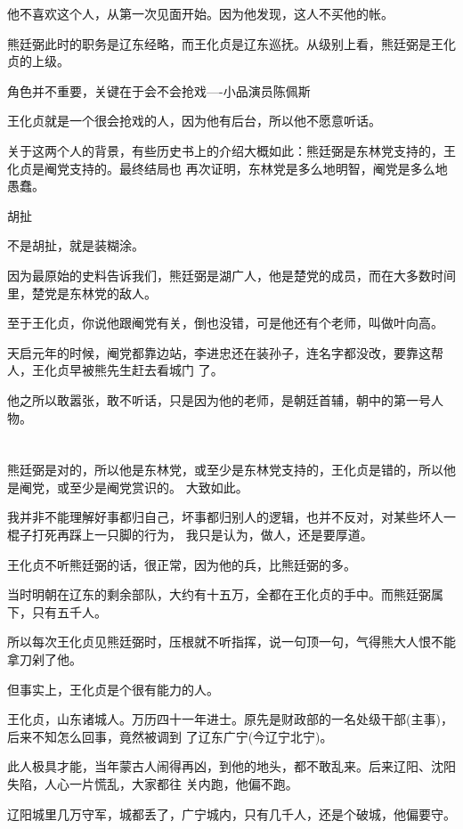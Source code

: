 \documentclass[11pt,a4paper,onecolumn]{article}
\begin{document}
他不喜欢这个人，从第一次见面开始。因为他发现，这人不买他的帐。

熊廷弼此时的职务是辽东经略，而王化贞是辽东巡抚。从级别上看，熊廷弼是王化贞的上级。

角色并不重要，关键在于会不会抢戏----小品演员陈佩斯

王化贞就是一个很会抢戏的人，因为他有后台，所以他不愿意听话。

关于这两个人的背景，有些历史书上的介绍大概如此：熊廷弼是东林党支持的，王化贞是阉党支持的。最终结局也
再次证明，东林党是多么地明智，阉党是多么地愚蠢。

胡扯

不是胡扯，就是装糊涂。

因为最原始的史料告诉我们，熊廷弼是湖广人，他是楚党的成员，而在大多数时间里，楚党是东林党的敌人。

至于王化贞，你说他跟阉党有关，倒也没错，可是他还有个老师，叫做叶向高。

天启元年的时候，阉党都靠边站，李进忠还在装孙子，连名字都没改，要靠这帮人，王化贞早被熊先生赶去看城门
了。

他之所以敢嚣张，敢不听话，只是因为他的老师，是朝廷首辅，朝中的第一号人物。

\section[\thesection]{}

熊廷弼是对的，所以他是东林党，或至少是东林党支持的，王化贞是错的，所以他是阉党，或至少是阉党赏识的。
大致如此。

我并非不能理解好事都归自己，坏事都归别人的逻辑，也并不反对，对某些坏人一棍子打死再踩上一只脚的行为，
我只是认为，做人，还是要厚道。

王化贞不听熊廷弼的话，很正常，因为他的兵，比熊廷弼的多。

当时明朝在辽东的剩余部队，大约有十五万，全都在王化贞的手中。而熊廷弼属下，只有五千人。

所以每次王化贞见熊廷弼时，压根就不听指挥，说一句顶一句，气得熊大人恨不能拿刀剁了他。

但事实上，王化贞是个很有能力的人。

王化贞，山东诸城人。万历四十一年进士。原先是财政部的一名处级干部(主事)，后来不知怎么回事，竟然被调到
了辽东广宁(今辽宁北宁)。

此人极具才能，当年蒙古人闹得再凶，到他的地头，都不敢乱来。后来辽阳、沈阳失陷，人心一片慌乱，大家都往
关内跑，他偏不跑。

辽阳城里几万守军，城都丢了，广宁城内，只有几千人，还是个破城，他偏要守。
\end{document}
